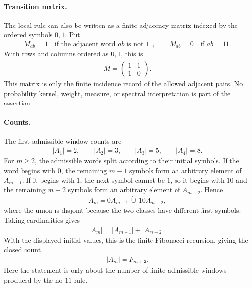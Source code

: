 \paragraph{Transition matrix.}
The local rule can also be written as a finite adjacency matrix indexed by the ordered symbols $0,1$. Put
$$
\begin{aligned}
M_{ab}=1\quad\text{if the adjacent word }ab\text{ is not }11,\qquad M_{ab}=0\quad\text{if }ab=11.
\end{aligned}
$$
With rows and columns ordered as $0,1$, this is
$$
\begin{aligned}
M=\begin{pmatrix}1&1\\1&0\end{pmatrix}.
\end{aligned}
$$
This matrix is only the finite incidence record of the allowed adjacent pairs. No probability kernel, weight, measure, or spectral interpretation is part of the assertion.

\paragraph{Counts.}
The first admissible-window counts are
$$
\begin{aligned}
|A_1|=2,\qquad |A_2|=3,\qquad |A_3|=5,\qquad |A_4|=8.
\end{aligned}
$$
For $m\geq 2$, the admissible words split according to their initial symbols. If the word begins with $0$, the remaining $m-1$ symbols form an arbitrary element of $A_{m-1}$. If it begins with $1$, the next symbol cannot be $1$, so it begins with $10$ and the remaining $m-2$ symbols form an arbitrary element of $A_{m-2}$. Hence
$$
\begin{aligned}
A_m=0A_{m-1}\,\dot\cup\,10A_{m-2},
\end{aligned}
$$
where the union is disjoint because the two classes have different first symbols. Taking cardinalities gives
$$
\begin{aligned}
|A_m|=|A_{m-1}|+|A_{m-2}|.
\end{aligned}
$$
With the displayed initial values, this is the finite Fibonacci recursion, giving the closed count
$$
\begin{aligned}
|A_m|=F_{m+2}.
\end{aligned}
$$
Here the statement is only about the number of finite admissible windows produced by the no-$11$ rule.

